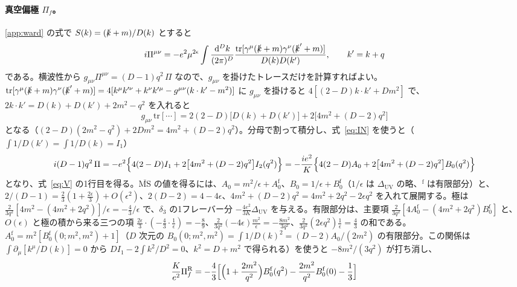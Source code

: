 \documentclass[a4paper,10pt]{ltjsarticle}
\newcommand{\dd}{\mathrm{d}}
\newcommand{\MSbar}{\overline{\mathrm{MS}}}
\newcommand{\DUV}{\Delta_{\mathrm{UV}}}
\begin{document}
\paragraph{真空偏極 $\Pi_f$。}\ref{app:ward} の式で $S(k)=(\slashed k+m)/D(k)$ とすると
\begin{equation*}
i\Pi^{\mu\nu}=-e^2\mu^{2\epsilon}\int\frac{\dd^Dk}{(2\pi)^D}\frac{\mathrm{tr}[\gamma^\mu(\slashed k+m)\gamma^\nu(\slashed k'+m)]}{D(k)D(k')},\qquad k'=k+q
\end{equation*}
である。横波性から $g_{\mu\nu}\Pi^{\mu\nu}=(D-1)q^2\,\Pi$ なので、$g_{\mu\nu}$ を掛けたトレースだけを計算すればよい。$\mathrm{tr}[\gamma^\mu(\slashed k+m)\gamma^\nu(\slashed k'+m)]=4[k^\mu k'^\nu+k^\nu k'^\mu-g^{\mu\nu}(k\cdot k'-m^2)]$ に $g_{\mu\nu}$ を掛けると $4[(2-D)k\cdot k'+Dm^2]$ で、$2k\cdot k'=D(k)+D(k')+2m^2-q^2$ を入れると
\begin{equation*}
g_{\mu\nu}\,\mathrm{tr}[\cdots]=2(2-D)\bigl[D(k)+D(k')\bigr]+2\bigl[4m^2+(D-2)q^2\bigr]
\end{equation*}
となる（$(2-D)(2m^2-q^2)+2Dm^2=4m^2+(D-2)q^2$）。分母で割って積分し、式~\eqref{eq:IN} を使うと（$\int1/D(k')=\int1/D(k)=I_1$）
\begin{equation*}
i(D-1)q^2\,\Pi=-e^2\Bigl\{4(2-D)I_1+2\bigl[4m^2+(D-2)q^2\bigr]I_2(q^2)\Bigr\}
=-\frac{ie^2}{K}\Bigl\{4(2-D)A_0+2\bigl[4m^2+(D-2)q^2\bigr]B_0(q^2)\Bigr\}
\end{equation*}
となり、式~\eqref{eq:V} の1行目を得る。$\MSbar$ の値を得るには、$A_0=m^2/\epsilon+A_0^{\mathrm f}$、$B_0=1/\epsilon+B_0^{\mathrm f}$（$1/\epsilon$ は $\DUV$ の略、$^{\mathrm f}$ は有限部分）と、$2/(D-1)=\frac23(1+\frac{2\epsilon}3)+O(\epsilon^2)$、$2(D-2)=4-4\epsilon$、$4m^2+(D-2)q^2=4m^2+2q^2-2\epsilon q^2$ を入れて展開する。極は $\frac{2}{3q^2}[4m^2-(4m^2+2q^2)]/\epsilon=-\frac43/\epsilon$ で、$\delta_3$ の1フレーバー分 $-\frac{4e^2}{3K}\DUV$ を与える。有限部分は、主要項 $\frac{2}{3q^2}[4A_0^{\mathrm f}-(4m^2+2q^2)B_0^{\mathrm f}]$ と、$O(\epsilon)$ と極の積から来る三つの項 $\frac{2\epsilon}{3}\cdot(-\frac43\cdot\frac1\epsilon)=-\frac89$、$\frac{2}{3q^2}(-4\epsilon)\frac{m^2}{\epsilon}=-\frac{8m^2}{3q^2}$、$\frac{2}{3q^2}(2\epsilon q^2)\frac1\epsilon=\frac43$ の和である。$A_0^{\mathrm f}=m^2[B_0^{\mathrm f}(0;m^2,m^2)+1]$（$D$ 次元の $B_0(0;m^2,m^2)=\int1/D(k)^2=(D-2)A_0/(2m^2)$ の有限部分。この関係は $\int\partial_\mu[k^\mu/D(k)]=0$ から $DI_1-2\int k^2/D^2=0$、$k^2=D+m^2$ で得られる）を使うと $-8m^2/(3q^2)$ が打ち消し、
\begin{equation*}
\frac{K}{e^2}\Pi_f^{\mathrm R}=-\frac43\Bigl[\Bigl(1+\frac{2m^2}{q^2}\Bigr)B_0^{\mathrm f}(q^2)-\frac{2m^2}{q^2}B_0^{\mathrm f}(0)-\frac13\Bigr]
\end{equation*}
\end{document}
